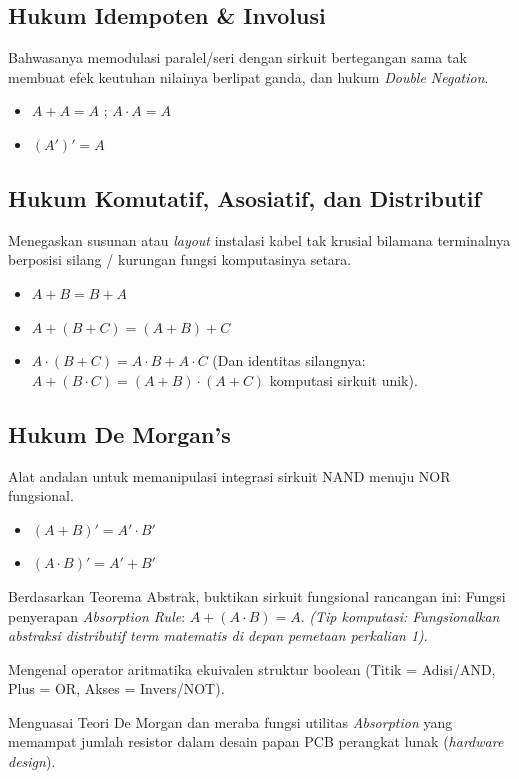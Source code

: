 \documentclass[../main.tex]{subfiles}
\begin{document}
\subsection{Hukum Idempoten \& Involusi}
Bahwasanya memodulasi paralel/seri dengan sirkuit bertegangan sama tak membuat efek keutuhan nilainya berlipat ganda, dan hukum \textit{Double Negation}.
\begin{itemize}
    \item $A + A = A$ ; $A \cdot A = A$
    \item $(A')' = A$
\end{itemize}

\subsection{Hukum Komutatif, Asosiatif, dan Distributif}
Menegaskan susunan atau \textit{layout} instalasi kabel tak krusial bilamana terminalnya berposisi silang / kurungan fungsi komputasinya setara. 
\begin{itemize}
    \item $A + B = B + A$
    \item $A + (B + C) = (A + B) + C$
    \item $A \cdot (B + C) = A \cdot B + A \cdot C$ (Dan identitas silangnya: $A + (B \cdot C) = (A + B) \cdot (A + C)$ komputasi sirkuit unik).
\end{itemize}

\subsection{Hukum De Morgan's}
Alat andalan untuk memanipulasi integrasi sirkuit NAND menuju NOR fungsional.
\begin{itemize}
    \item $(A + B)' = A' \cdot B'$
    \item $(A \cdot B)' = A' + B'$
\end{itemize}

\begin{latihan}
  \item Berdasarkan Teorema Abstrak, buktikan sirkuit fungsional rancangan ini: Fungsi penyerapan \textit{Absorption Rule}: $A + (A \cdot B) = A$. \textit{(Tip komputasi: Fungsionalkan abstraksi distributif term matematis di depan pemetaan perkalian 1)}.
\end{latihan}

\begin{checklist}
  \item Mengenal operator aritmatika ekuivalen struktur boolean (Titik = Adisi/AND, Plus = OR, Akses = Invers/NOT).
  \item Menguasai Teori De Morgan dan meraba fungsi utilitas \textit{Absorption} yang memampat jumlah resistor dalam desain papan PCB perangkat lunak (\textit{hardware design}).
\end{checklist}
\end{document}
